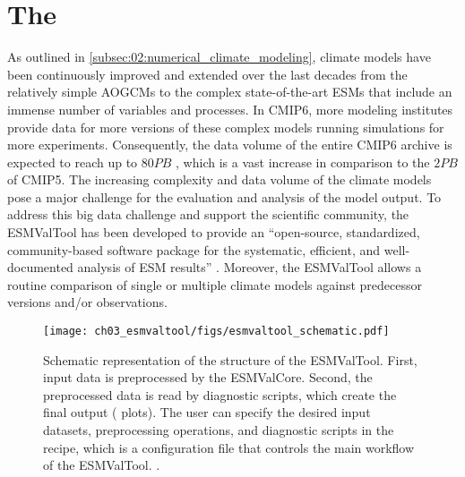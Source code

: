 \section{The }
\label{sec:03:esmvaltool}

As outlined in \cref{subsec:02:numerical_climate_modeling}, climate models have
been continuously improved and extended over the last decades from the
relatively simple \acp{AOGCM} to the complex state-of-the-art \acp{ESM} that
include an immense number of variables and processes. In \acs{CMIP}6, more
modeling institutes provide data for more versions of these complex models
running simulations for more experiments. Consequently, the data volume of the
entire \acs{CMIP}6 archive is expected to reach up to $80 \unit{PB}$
\autocite{Balaji2018}, which is a vast increase in comparison to the $2
\unit{PB}$ of \acs{CMIP}5. The increasing complexity and data volume of the
climate models pose a major challenge for the evaluation and analysis of the
model output. To address this big data challenge and support the scientific
community, the \ac{ESMValTool} has been developed to provide an
\enquote{open-source, standardized, community-based software package for the
  systematic, efficient, and well-documented analysis of \ac{ESM} results}
\autocite{Righi2020}. Moreover, the \ac{ESMValTool} allows a routine comparison
of single or multiple climate models against predecessor versions and/or
observations.

\begin{figure}[t]
  \centering
  \texttt{[image: 
    ch03\_esmvaltool/figs/esmvaltool\_schematic.pdf]}
  \caption[
    Schematic representation of the structure of the \acf{ESMValTool}.
  ]{
    Schematic representation of the structure of the \acf{ESMValTool}. First,
    input data is preprocessed by the \acf{ESMValCore}. Second, the
    preprocessed data is read by diagnostic scripts, which create the final
    output (\eg{} plots). The user can specify the desired input datasets,
    preprocessing operations, and diagnostic scripts in the recipe, which is a
    configuration file that controls the main workflow of the \acs{ESMValTool}.
    .
  }
  \label{fig:03:esmvaltool_schematic}
\end{figure}

